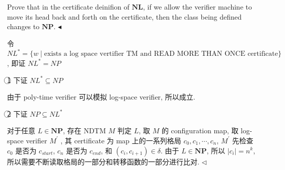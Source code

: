 \documentclass[11pt]{article}
\newcommand{\NP}{\mathbf{NP}}
\newcommand{\NL}{ \mathbf{NL}}
\newenvironment{problem}[2][Problem]{\begin{trivlist}
		\item[\hskip \labelsep {\bfseries #1}\hskip \labelsep {\bfseries #2.}]}{\hfill$\blacktriangleleft$\end{trivlist}}
\newenvironment{answer}[1][Answer]{\begin{trivlist}
		\item[\hskip \labelsep {\bfseries #1.}\hskip \labelsep]}{\hfill$\lhd$\end{trivlist}}
\begin{document}
	\begin{problem}{6.(20 points)}
		Prove that in the certificate deinifion of $\NL$, if we allow the verifier machine to move its head back and forth on the certificate, then the class being defined changes to $\NP$.
	\end{problem}
	\begin{answer}
		令 $NL^*=\{w\mid\text{exists a log space vertifier TM and READ MORE THAN ONCE certificate}\}$, 即证 $NL^*=NP$
		
		\textcircled{1} 下证 $NL^*\subseteq NP$
	
		由于 poly-time verifier 可以模拟 log-space verifier, 所以成立.
		
		\textcircled{2} 下证 $NP\subseteq NL^*$
		
		对于任意 $L\in\NP$, 存在 NDTM $M$ 判定 $L$, 取 $M$ 的 configuration map, 取 log-space verifier $M^\prime$ , 其 certificate 为 map 上的一系列格局 $c_0,c_1,\cdots,c_n$, $M^\prime$ 先检查 $c_0$ 是否为 $c_{start}$, $c_n$ 是否为 $c_{end}$, 和 $(c_i,c_{i+1})\in\delta$. 由于 $L\in\NP$, 所以 $|c_i|=n^k$, 所以需要不断读取格局的一部分和转移函数的一部分进行比对.
	\end{answer}
\end{document}
